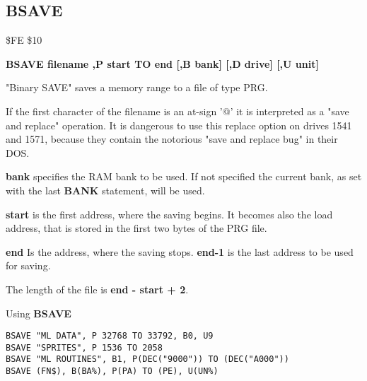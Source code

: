 
\newpage
\subsection{BSAVE}
\begin{description}[leftmargin=2cm,style=nextline]
\item [Token:] \$FE \$10
\item [Format:] {\bf BSAVE filename ,P start TO end
                [,B bank] [,D drive] [,U unit] }
\item [Usage:]
   "Binary SAVE" saves a memory range to
   a file of type PRG.

   \filenamedefinition
   If the first character of the filename is an at-sign '@' it
   is interpreted as a "save and replace" operation. It is dangerous
   to use this replace option on drives 1541 and 1571, because they
   contain the notorious "save and replace bug" in their DOS.

   {\bf bank} specifies the RAM bank to be used.
   If not specified the current bank, as set with the last
   {\bf BANK} statement, will be used.

   {\bf start} is the first address, where the saving begins.
   It becomes also the load address,
   that is stored in the first two bytes of the PRG file.

   {\bf end} Is the address, where the saving stops.
   {\bf end-1} is the last address to be used for saving.

   \drivedefinition

   \unitdefinition

\item [Remarks:]
   The length of the file is {\bf end - start + 2}.

\item [Example:] Using {\bf BSAVE}
\begin{tcolorbox}[colback=black,coltext=white]
\verbatimfont{\codefont}
\begin{verbatim}
BSAVE "ML DATA", P 32768 TO 33792, B0, U9
BSAVE "SPRITES", P 1536 TO 2058
BSAVE "ML ROUTINES", B1, P(DEC("9000")) TO (DEC("A000"))
BSAVE (FN$), B(BA%
\end{verbatim}
\end{tcolorbox}
\end{description}


\newpage
